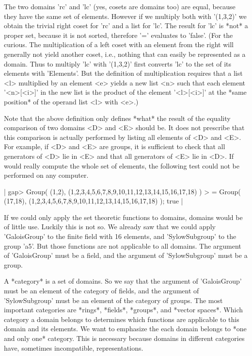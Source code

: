 The two  domains 'rc'  and 'lc'  (yes, cosets are domains too) are equal,
because they have the same set of elements.  However if we multiply  both
with '(1,3,2)' we obtain the trivial right coset for 'rc' and  a list for
'lc'.   The  result for  'lc' is *not* a proper  set,  because it  is not
sorted,  therefore '='  evaluates to 'false'.   (For  the  curious.   The
multiplication  of  a  left coset  with  an element  from the right  will
generally not  yield  another  coset, i.e.,  nothing that  can easily  be
represented as a domain.   Thus  to  multiply 'lc' with '(1,3,2)'  {\GAP}
first converts 'lc' to the set  of its elements with 'Elements'.  But the
definition of multiplication  requires that a list <l>  multiplied  by an
element <e>  yields a new  list <n> such that each  element '<n>[<i>]' in
the new list is  the  product  of the  element  '<l>[<i>]'  at  the *same
position* of the operand list <l> with <e>.)

Note  that the  above  definition only defines  *what* the result  of the
equality comparison of two domains  <D> and <E>  should be.  It  does not
prescribe  that  this comparison  is actually performed  by  listing  all
elements  of  <D> and <E>.  For example, if <D> and <E> are groups, it is
sufficient to  check that  all generators of <D>  lie in <E> and that all
generators of <E> lie  in  <D>.  If {\GAP} would really compute the whole
set  of  elements, the  following  test could  not  be  performed  on any
computer.

|    gap> Group( (1,2), (1,2,3,4,5,6,7,8,9,10,11,12,13,14,15,16,17,18) )
    > = Group( (17,18), (1,2,3,4,5,6,7,8,9,10,11,12,13,14,15,16,17,18) );
    true |

If we could only  apply the set theoretic  functions to domains,  domains
would be of little use.  Luckily this is not so.  We already  saw that we
could  apply 'GaloisGroup' to  the  finite  field  with  16 elements, and
'SylowSubgroup'  to   the  group  'a5'.   But  those  functions  are  not
applicable  to  all  domains.   The  argument of 'GaloisGroup' must be  a
field, and the argument of 'SylowSubgroup' must be a group.

A *category*  is a  set of  domains.   So we  say  that the  argument  of
'GaloisGroup'  must  be  an element of  the  category  of fields, and the
argument of 'SylowSubgroup' must be an element of the category of groups.
The  most important  categories  are  *rings*,  *fields*,  *groups*,  and
*vector spaces*.    Which category  a domain belongs to determines  which
functions are  applicable  to this  domain and its elements.  We  want to
emphasize the each  domain belongs to *one and only  one* category.  This
is necessary  because domains  in  different categories  have,  sometimes
incompatible, representations.

